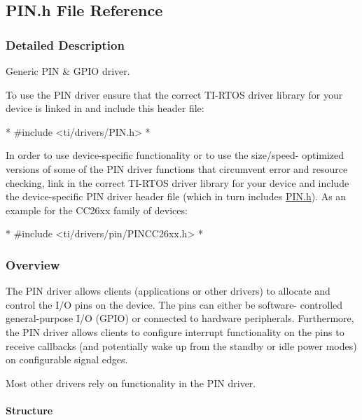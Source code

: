 \subsection{P\-I\-N.\-h File Reference}
\label{_p_i_n_8h}


\subsubsection{Detailed Description}
Generic P\-I\-N \& G\-P\-I\-O driver. 



To use the P\-I\-N driver ensure that the correct T\-I-\/\-R\-T\-O\-S driver library for your device is linked in and include this header file\-: 
\begin{DoxyCode}
*    #include <ti/drivers/PIN.h>
*    
\end{DoxyCode}


In order to use device-\/specific functionality or to use the size/speed-\/ optimized versions of some of the P\-I\-N driver functions that circumvent error and resource checking, link in the correct T\-I-\/\-R\-T\-O\-S driver library for your device and include the device-\/specific P\-I\-N driver header file (which in turn includes \hyperlink{_p_i_n_8h}{P\-I\-N.\-h}). As an example for the C\-C26xx family of devices\-: 
\begin{DoxyCode}
*    #include <ti/drivers/pin/PINCC26xx.h>
*    
\end{DoxyCode}


\subsubsection*{Overview}

The P\-I\-N driver allows clients (applications or other drivers) to allocate and control the I/\-O pins on the device. The pins can either be software-\/ controlled general-\/purpose I/\-O (G\-P\-I\-O) or connected to hardware peripherals. Furthermore, the P\-I\-N driver allows clients to configure interrupt functionality on the pins to receive callbacks (and potentially wake up from the standby or idle power modes) on configurable signal edges.

Most other drivers rely on functionality in the P\-I\-N driver.

\paragraph*{Structure}

